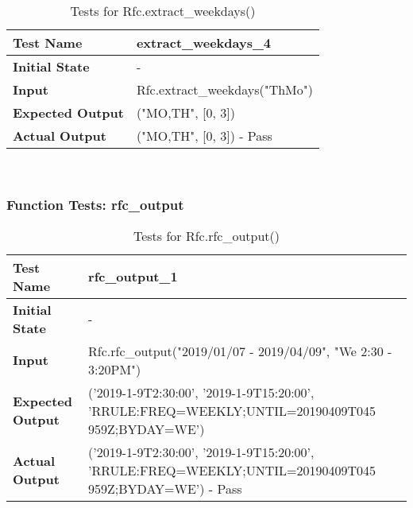 \documentclass[12pt, titlepage]{article}
\begin{document}
            \hfill	%
	    \begin{table}[!htbp]
			\begin{tabularx}{\textwidth}{|l|X|}%
				\hline
                \textbf{Test Name} & extract\_weekdays\_4  
                \\\hline
                \textbf{Initial State} & -
                \\\hline
                \textbf{Input} & Rfc.extract\_weekdays("ThMo")
                \\\hline 
                \textbf{Expected Output} & ("MO,TH", [0, 3])
                \\\hline
                \textbf{Actual Output} & ("MO,TH", [0, 3]) - Pass
                \\\hline
			\end{tabularx}\\ %
			\caption{Tests for Rfc.extract\_weekdays()}
			\label{Table}
	    \end{table}
	    
	    \FloatBarrier       %
		
	    \subsubsection{Function Tests: rfc\_output}
	    \begin{table}[!htbp]
			\begin{tabularx}{\textwidth}{|l|X|}%
				\hline
                \textbf{Test Name} & rfc\_output\_1  
                \\\hline
                \textbf{Initial State} & -
                \\\hline
                \textbf{Input} & Rfc.rfc\_output("2019/01/07 - 2019/04/09", "We 2:30 - 3:20PM")
                \\\hline 
                \textbf{Expected Output} & ('2019-1-9T2:30:00', '2019-1-9T15:20:00', 'RRULE:FREQ=WEEKLY;UNTIL=20190409T045 \newline 959Z;BYDAY=WE')
                \\\hline
                \textbf{Actual Output} & ('2019-1-9T2:30:00', '2019-1-9T15:20:00', 'RRULE:FREQ=WEEKLY;UNTIL=20190409T045 \newline 959Z;BYDAY=WE') - Pass
                \\\hline
	        \end{tabularx}\\ %
			\caption{Tests for Rfc.rfc\_output()}
			\label{Table}
	    \end{table}
	    
\end{document}

